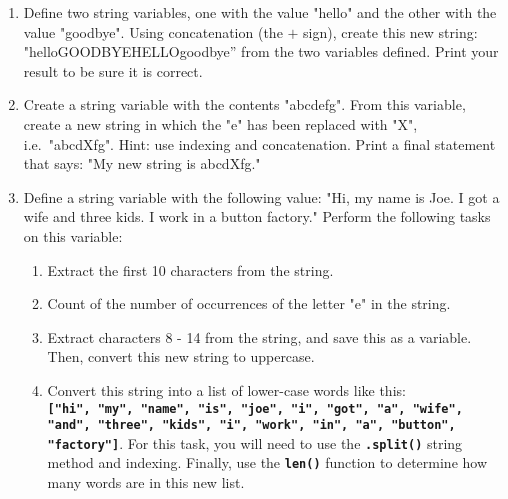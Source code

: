 \documentclass{article}[12pt]
\newcommand{\code}[1]{\textbf{\texttt{#1}}}
\begin{document}
\begin{enumerate}[itemsep=5ex]
	
	\item Define two string variables, one with the value "hello" and the other with the value "goodbye". Using concatenation (the $+$ sign), create this new string: "helloGOODBYEHELLOgoodbye'' from the two variables defined. Print your result to be sure it is correct.

	\item Create a string variable with the contents "abcdefg". From this variable, create a new string in which the "e" has been replaced with "X", i.e.\ "abcdXfg". Hint: use indexing and concatenation. Print a final statement that says: "My new string is abcdXfg."
	
	\item Define a string variable with the following value: "Hi, my name is Joe. I got a wife and three kids. I work in a button factory." Perform the following tasks on this variable:
	\begin{enumerate}[itemsep=2ex]
		
		\item Extract the first 10 characters from the string.
		\item Count of the number of occurrences of the letter "e" in the string.
		\item Extract characters 8 - 14 from the string, and save this as a variable. Then, convert this new string to uppercase.
		\item Convert this string into a list of lower-case words like this: \\ \code{["hi", "my", "name", "is", "joe", "i", "got", "a", "wife", "and", "three", "kids", "i", "work", "in", "a", "button", "factory"]}. For this task, you will need to use the \code{.split()} string method and indexing. Finally, use the \code{len()} function to determine how many words are in this new list.
		
	\end{enumerate}
	

	
\end{enumerate}
\end{document}
